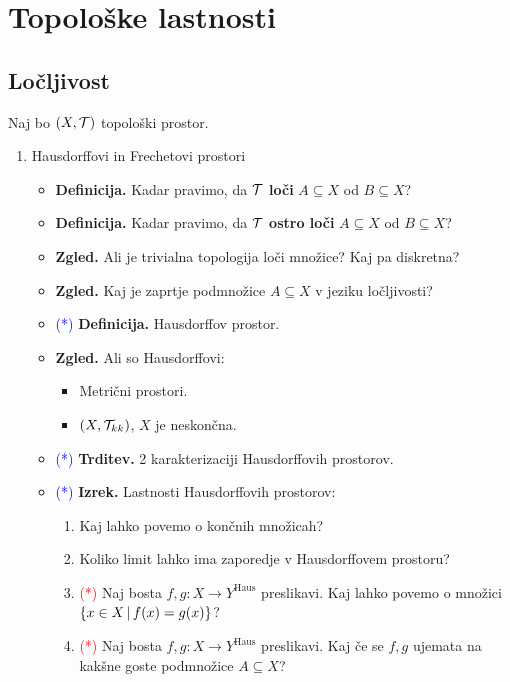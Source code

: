 \section{Topološke lastnosti}

\subsection{Ločljivost}
Naj bo $(X, \mathcal{T})$ topološki prostor.
\begin{enumerate}
    \item Hausdorffovi in Frechetovi prostori
    \begin{itemize}
        \item \textbf{Definicija.} Kadar pravimo, da $\mathcal{T}$ \textbf{loči} $A \subseteq X$ od $B \subseteq X$?
        \item \textbf{Definicija.} Kadar pravimo, da $\mathcal{T}$ \textbf{ostro loči} $A \subseteq X$ od $B \subseteq X$?
        \item \textbf{Zgled.} Ali je trivialna topologija loči množice? Kaj pa diskretna?
        \item \textbf{Zgled.} Kaj je zaprtje podmnožice $A \subseteq X$ v jeziku ločljivosti?
        \item \textcolor{blue}{(*)} \textbf{Definicija.} Hausdorffov prostor.
        \item \textbf{Zgled.} Ali so Hausdorffovi:
        \begin{itemize}
            \item Metrični prostori.
            \item $(X, \mathcal{T}_{kk})$, $X$ je neskončna.
        \end{itemize}
        \item \textcolor{blue}{(*)} \textbf{Trditev.} 2 karakterizaciji Hausdorffovih prostorov.
        \item \textcolor{blue}{(*)} \textbf{Izrek.} Lastnosti Hausdorffovih prostorov:
        \begin{enumerate}
            \item Kaj lahko povemo o končnih množicah?
            \item Koliko limit lahko ima zaporedje v Hausdorffovem prostoru?
            \item \textcolor{red}{(*)} Naj bosta $f,g: X \to Y^\text{Haus}$ preslikavi. Kaj lahko povemo o množici $\{x \in X \,|\, f(x) = g(x)\}$?
            \item \textcolor{red}{(*)} Naj bosta $f,g: X \to Y^\text{Haus}$ preslikavi. Kaj če se $f, g$ ujemata na kakšne goste podmnožice $A \subseteq X$?

\end{enumerate}
\end{itemize}
\end{enumerate}
